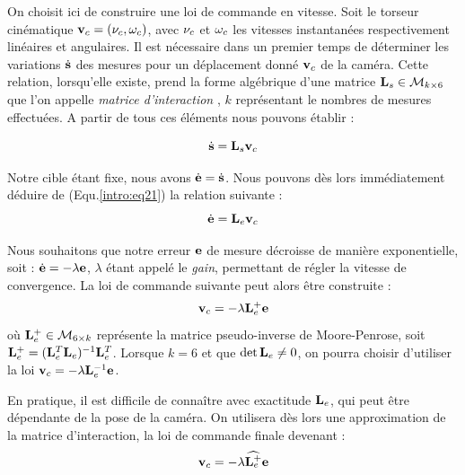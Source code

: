 On choisit ici de construire une loi de commande en vitesse. Soit le torseur 
cinématique ${\bf v}_c = ({\bf \nu}_c, {\bf \omega}_c)$, avec ${\bf \nu}_c$ et 
${\bf \omega}_c$ les vitesses instantanées respectivement linéaires et 
angulaires. Il est nécessaire dans un premier temps de déterminer les 
variations $\dot {\bf s}$ des mesures pour un déplacement donné ${\bf v}_c$ de 
la caméra. Cette relation, lorsqu'elle existe, prend la forme algébrique d'une 
matrice ${\bf L}_s \in \mathcal M_{k\times 6}$ que l'on appelle {\it matrice 
d'interaction} \cite{espiau1992}, $k$ représentant le nombres de mesures 
effectuées. A partir de tous ces éléments nous pouvons établir :

\begin{equation}
\dot {\bf s} = {\bf L}_s {\bf v}_c
\label{intro:eq21}
\end{equation}

Notre cible étant fixe, nous avons $\dot {\bf e} = \dot {\bf s}$. Nous pouvons 
dès lors immédiatement déduire de (Equ.\ref{intro:eq21}) la relation suivante :
\begin{equation}
\dot {\bf e} = {\bf L}_e {\bf v}_c
\label{intro:eq22}
\end{equation}

Nous souhaitons que notre erreur ${\bf e}$ de mesure décroisse de manière 
exponentielle, soit : $\dot {\bf e} = - \lambda {\bf e}$, $\lambda$ étant 
appelé 
le {\it gain}, permettant de régler la vitesse de convergence. La loi de 
commande suivante peut alors être construite :
\begin{equation}
{\bf v}_c = - \lambda {\bf L}_e^+ {\bf e} 
\label{intro:eq23}
\end{equation}
où ${\bf L}_e^+ \in \mathcal M_{6 \times k}$ représente la matrice 
pseudo-inverse de Moore-Penrose, soit ${\bf L}_e^+ = ({\bf L}_e^T {\bf 
L}_e)^{-1} {\bf L}_e^T$. Lorsque $k = 6$ et que $\det {\bf L}_e \neq 0$, on 
pourra choisir d'utiliser la loi ${\bf v}_c = - \lambda {\bf L}_e^{-1} {\bf e} 
$.

En pratique, il est difficile de connaître avec exactitude ${\bf L}_e$, qui 
peut 
être dépendante de la pose de la caméra. On utilisera dès lors une 
approximation 
de la matrice d'interaction, la loi de commande finale devenant :
\begin{equation}
{\bf v}_c = - \lambda \widehat {{\bf L}_e^+} {\bf e} 
\label{intro:eq24}
\end{equation}

